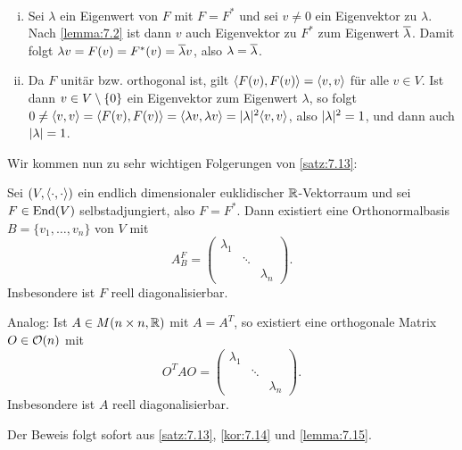 \begin{beweis}
	\mbox{} \\[-.9cm]
	\begin{enumerate}[(i)]
		\item Sei $\lambda$ ein Eigenwert von $F$ mit $F = F^*$ und sei $v \neq 0$ ein Eigenvektor zu $\lambda$.
		Nach \autoref{lemma:7.2} ist dann $v$ auch Eigenvektor zu $F^*$ zum Eigenwert $\overline{\lambda}$.
		Damit folgt $\lambda v = F(v) = F^*(v) = \overline{\lambda} v$, also $\lambda = \overline{\lambda}$.
		\item Da $F$ unitär bzw. orthogonal ist, gilt $\left\langle F(v),F(v)\right\rangle = \left\langle v,v\right\rangle$ für alle $v \in V$.
		Ist dann $v \in V \setminus \{0\}$ ein Eigenvektor zum Eigenwert $\lambda$, so folgt $0 \neq \sk{v,v} = \sk{F(v),F(v)} = \sk{\lambda v,\lambda v} = \abs{\lambda}^2 \sk{v,v}$, also $\lvert\lambda\rvert^2 = 1$, und dann auch $\lvert\lambda\rvert = 1$. \qedhere
	\end{enumerate}
\end{beweis}

Wir kommen nun zu sehr wichtigen Folgerungen von \autoref{satz:7.13}:

\begin{korollar}
	\label{kor:7.16}
	Sei $(V,\left\langle\cdot,\cdot\right\rangle)$ ein endlich dimensionaler euklidischer $\mathbb{R}$-Vektorraum und sei $F \in \operatorname{End}(V)$ selbstadjungiert, also $F = F^*$.
	Dann existiert eine Orthonormalbasis $B = \{v_1,\dots,v_n\}$ von $V$ mit
	\[
		A_B^F = \begin{pmatrix}
		\lambda_1 & & \\
		& \ddots & \\
		& & \lambda_n
		\end{pmatrix}.
	\]
	Insbesondere ist $F$ reell diagonalisierbar.
	
	Analog: Ist $A \in M(n \times n,\mathbb{R})$ mit $A = A^T$, so existiert eine orthogonale Matrix $O \in \mathcal{O}(n)$ mit
	\[
		O^TAO = \begin{pmatrix}
		\lambda_1 & & \\
		& \ddots & \\
		& & \lambda_n
		\end{pmatrix}.
	\]
	Insbesondere ist $A$ reell diagonalisierbar.
\end{korollar}

\begin{beweis}
	Der Beweis folgt sofort aus \autoref{satz:7.13}, \autoref{kor:7.14} und \autoref{lemma:7.15}. \qedhere
\end{beweis}

